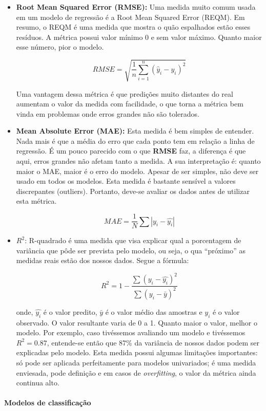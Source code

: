 \documentclass[
  letterpaper,
  DIV=11,
  numbers=noendperiod]{scrreprt}
\let\oldparagraph\paragraph
\renewcommand{\paragraph}[1]{\oldparagraph{#1}\mbox{}}
\begin{document}
\begin{itemize}
\item
  \textbf{Root Mean Squared Error (RMSE):} Uma medida muito comum usada
  em um modelo de regressão é a Root Mean Squared Error (REQM). Em
  resumo, o REQM é uma medida que mostra o quão espalhados estão esses
  resíduos. A métrica possui valor mínimo 0 e sem valor máximo. Quanto
  maior esse número, pior o modelo.

  \[
  RMSE = \sqrt{\frac{1}{n}\sum_{i = 1}^{n}  (\hat y_i - y_i)^2}
  \]

  Uma vantagem dessa métrica é que predições muito distantes do real
  aumentam o valor da medida com facilidade, o que torna a métrica bem
  vinda em problemas onde erros grandes não são tolerados.
\item
  \textbf{Mean Absolute Error (MAE):} Esta medida é bem simples de
  entender. Nada mais é que a média do erro que cada ponto tem em
  relação a linha de regressão. É um pouco parecido com o que
  \textbf{RMSE} faz, a diferença é que aqui, erros grandes não afetam
  tanto a medida. A sua interpretação é: quanto maior o MAE, maior é o
  erro do modelo. Apesar de ser simples, não deve ser usado em todos os
  modelos. Esta medida é bastante sensível a valores discrepantes
  (outliers). Portanto, deve-se avaliar os dados antes de utilizar esta
  métrica.

  \[
  MAE = \frac{1}{N}\sum|y_i - \hat{y_i}|
  \]
\item
  \(R^2\): R-quadrado é uma medida que visa explicar qual a porcentagem
  de variância que pôde ser prevista pelo modelo, ou seja, o qua
  ``próximo'' as medidas reais estão dos nossos dados. Segue a fórmula:

  \[
  R^2 = 1 - \frac{\sum(y_i - {\hat{y_i}})^2} {\sum(y_i - {\bar{y}})^2}
  \]

  onde, \(\hat{y_i}\) é o valor predito, \(\bar{y}\) é o valor médio das
  amostras e \(y_i\) é o valor observado. O valor resultante varia de 0
  a 1. Quanto maior o valor, melhor o modelo. Por exemplo, caso
  tivéssemos avaliando um modelo e tivéssemos \(R^2 = 0.87\), entende-se
  então que 87\% da variância de nossos dados podem ser explicadas pelo
  modelo. Esta medida possui algumas limitações importantes: só pode ser
  aplicada perfeitamente para modelos univariados; é uma medida
  enviesada, pode definição e em casos de \emph{overfitting}, o valor da
  métrica ainda continua alto.
\end{itemize}

\hypertarget{modelos-de-classificauxe7uxe3o}{%
\paragraph{Modelos de
classificação}\label{modelos-de-classificauxe7uxe3o}}
\end{document}
